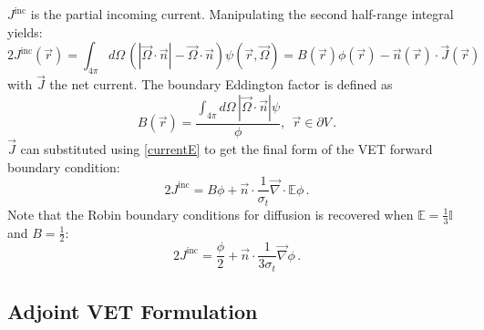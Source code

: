\documentclass[12pt]{report}
\newcommand{\vr}{\vec{r}}
\newcommand{\vJ}{\vec{J}}
\newcommand{\vO}{\vec{\Omega}}
\renewcommand{\div}{\vec{\nabla} \cdot}
\newcommand{\grad}{\vec{\nabla}}
\newcommand{\bound}{\partial V}
\newcommand{\vn}{\vec{n}}
\newcommand{\Edd}{\mathbb{E}}
\newcommand{\BEdd}{B}
\newcommand{\sigt}{\sigma_t}
\begin{document}
$J^{\text{inc}}$ is the partial incoming current. 
Manipulating the second half-range integral yields:
\begin{equation}
2 J^{\text{inc}}(\vr) = \int_{4\pi} d \Omega\,  \left( | \vO \cdot \vn |- \vO\cdot\vn\right)  \psi(\vr,\vO) 
= \BEdd(\vr) \phi(\vr) - \vn(\vr) \cdot \vJ(\vr)
\end{equation}
with $\vJ$ the net current. The boundary Eddington factor is defined as
\begin{equation}
\BEdd(\vr) = \frac{\int_{4 \pi} d\Omega \, | \vO \cdot \vn | \psi}{\phi} ,\ \ \vr \in \bound \,.
\end{equation}
$\vJ$ can substituted using \eqref{currentE} to get the final form of the VET forward boundary condition:
\begin{equation}
2 J^{\text{inc}} = \BEdd \phi + \vn \cdot \frac{1}{\sigt} \div \Edd \phi \,.
\end{equation}
Note that the Robin boundary conditions for diffusion is recovered when $\Edd = \tfrac{1}{3} \mathbb{I}$ and $B=\tfrac{1}{2}$:
\[
2 J^{\text{inc}} = \frac{\phi}{2} + \vn \cdot \frac{1}{3\sigt} \grad \phi \,.
\]


\subsection{Adjoint VET Formulation}
\end{document}

